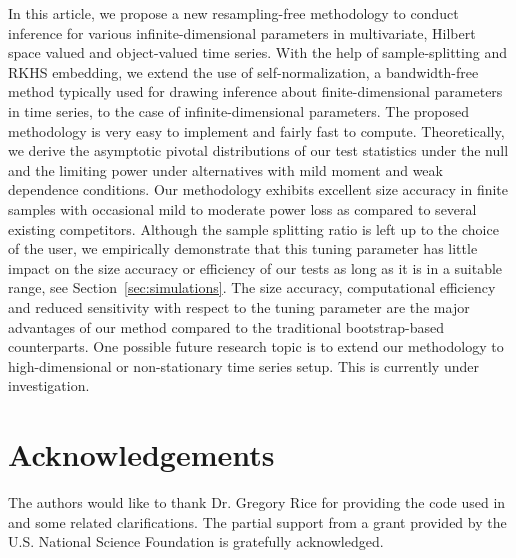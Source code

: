 \documentclass[11pt]{article}
\theoremstyle{plain}
\theoremstyle{definition}
\theoremstyle{remark}
\begin{document}
In this article, we propose a new resampling-free methodology to conduct inference for various infinite-dimensional parameters in multivariate, Hilbert space valued  and object-valued time series. With the help of sample-splitting and RKHS embedding, we extend the use of self-normalization, a bandwidth-free method typically used for drawing inference about finite-dimensional parameters in time series, to the case of infinite-dimensional parameters. The proposed methodology is very easy to implement and fairly fast to compute. Theoretically, we derive the asymptotic pivotal distributions of our test statistics under the null and the limiting power under alternatives with mild moment and weak dependence conditions. 
Our methodology exhibits excellent size accuracy in finite samples with occasional mild to moderate power loss as compared to several existing competitors. 
Although the sample splitting ratio is left up to the choice of the user, we empirically demonstrate that this tuning parameter has little impact on the size accuracy or efficiency of our tests as long as it is in a suitable range, see Section~\ref{sec:simulations}. 
The size accuracy, computational efficiency and reduced sensitivity with respect to the tuning parameter are the major advantages of our method compared to the traditional bootstrap-based counterparts. One possible future research topic is to extend our methodology to high-dimensional or non-stationary time series setup. This is currently under investigation. 

\section*{Acknowledgements}
The authors would like to thank Dr. Gregory Rice for providing the code used in \cite{horvath2015testing} and some related clarifications. The partial support from a grant provided by the U.S. National Science Foundation is gratefully acknowledged.


\bigskip
    
	\setlength{\bibsep}{0pt plus 0.25ex}
	
	

    
    
\end{document}

